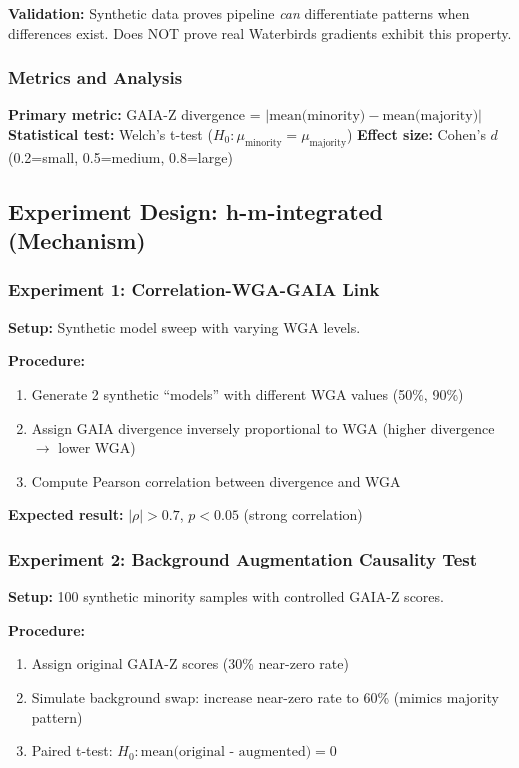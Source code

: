 \textbf{Validation:} Synthetic data proves pipeline \emph{can} differentiate patterns when differences exist. Does NOT prove real Waterbirds gradients exhibit this property.

\subsubsection{Metrics and Analysis}

\textbf{Primary metric:} GAIA-Z divergence = $|\text{mean(minority)} - \text{mean(majority)}|$
\textbf{Statistical test:} Welch's t-test ($H_0: \mu_{\text{minority}} = \mu_{\text{majority}}$)
\textbf{Effect size:} Cohen's $d$ (0.2=small, 0.5=medium, 0.8=large)

\subsection{Experiment Design: h-m-integrated (Mechanism)}

\subsubsection{Experiment 1: Correlation-WGA-GAIA Link}

\textbf{Setup:} Synthetic model sweep with varying WGA levels.

\textbf{Procedure:}
\begin{enumerate}
\item Generate 2 synthetic ``models'' with different WGA values (50\%, 90\%)
\item Assign GAIA divergence inversely proportional to WGA (higher divergence $\rightarrow$ lower WGA)
\item Compute Pearson correlation between divergence and WGA
\end{enumerate}

\textbf{Expected result:} $|\rho| > 0.7$, $p<0.05$ (strong correlation)

\subsubsection{Experiment 2: Background Augmentation Causality Test}

\textbf{Setup:} 100 synthetic minority samples with controlled GAIA-Z scores.

\textbf{Procedure:}
\begin{enumerate}
\item Assign original GAIA-Z scores (30\% near-zero rate)
\item Simulate background swap: increase near-zero rate to 60\% (mimics majority pattern)
\item Paired t-test: $H_0: \text{mean(original - augmented)} = 0$
\end{enumerate}


